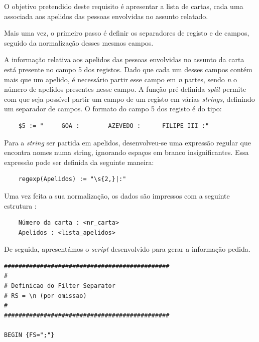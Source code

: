 \documentclass[11pt,a4paper]{report}
\begin{document}
\quad O objetivo pretendido deste requisito é apresentar a lista de cartas, cada uma associada aos apelidos das pessoas envolvidas no assunto relatado. 

\quad Mais uma vez, o primeiro passo é definir os separadores de registo e de campos, seguido da normalização desses mesmos campos.

\quad A informação relativa aos apelidos das pessoas envolvidas no assunto da carta está presente no campo 5 dos registos. Dado que cada um desses campos contém mais que um apelido, é necessário partir esse campo em \textit{n} partes, sendo \textit{n} o número de apelidos presentes nesse campo. A função pré-definida \textit{split} permite com que seja possível partir um campo de um registo em várias \textit{strings}, definindo um separador de campos. O formato do campo 5 dos registo é do tipo:

\begin{verbatim}
    $5 := "     GOA :        AZEVEDO :      FILIPE III :"
\end{verbatim}

Para a \textit{string} ser partida em apelidos, desenvolveu-se uma expressão regular que encontra nomes numa string, ignorando espaços em branco insignificantes. Essa expressão pode ser definida da seguinte maneira:

\begin{verbatim}
    regexp(Apelidos) := "\s{2,}|:"
\end{verbatim}

\quad Uma vez feita a sua normalização, os dados são impressos com a seguinte estrutura :

\begin{verbatim}
    Número da carta : <nr_carta>
    Apelidos : <lista_apelidos>
\end{verbatim}

\quad De seguida, apresentámos o \textit{script} desenvolvido para gerar a informação pedida.

\newpage 
\begin{verbatim}
##############################################
#
# Definicao do Filter Separator
# RS = \n (por omissao)
#
##############################################

BEGIN {FS=";"}
\end{verbatim}
\end{document}
